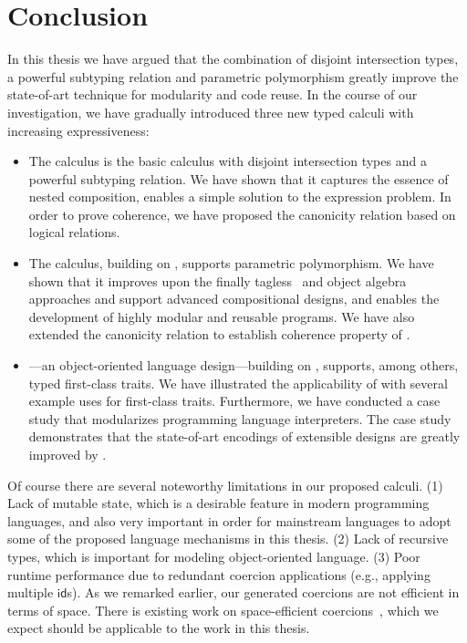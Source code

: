 \chapter{Conclusion}
\label{chap:conclusion}


In this thesis we have argued that the combination of disjoint intersection
types, a powerful subtyping relation and parametric polymorphism greatly improve
the state-of-art technique for modularity and code reuse. In the course of our
investigation, we have gradually introduced three new typed calculi with
increasing expressiveness:
\begin{itemize}
\item The \namee calculus is the basic calculus with disjoint intersection types
  and a powerful subtyping relation. We have shown that it captures the essence
  of nested composition, enables a simple solution to the expression problem. In
  order to prove coherence, we have proposed the canonicity relation based on
  logical relations.
\item The \fnamee calculus, building on \namee, supports parametric
  polymorphism. We have shown that it improves upon the finally
  tagless~\citep{CARETTE_2009} and object
  algebra~\citep{oliveira2012extensibility} approaches and support advanced
  compositional designs, and enables the development of highly modular and
  reusable programs. We have also extended the canonicity relation to establish
  coherence property of \fnamee.
\item \sedel---an object-oriented language design---building on \fnamee,
  supports, among others, typed first-class traits. We have illustrated the
  applicability of \sedel with several example uses for first-class traits.
  Furthermore, we have conducted a case study that modularizes programming
  language interpreters. The case study demonstrates that the state-of-art
  encodings of extensible designs are greatly improved by \sedel.
\end{itemize}


Of course there are several noteworthy limitations in our proposed calculi. (1)
Lack of mutable state, which is a desirable feature in modern programming
languages, and also very important in order for mainstream languages to adopt
some of the proposed language mechanisms in this thesis. (2) Lack of recursive
types, which is important for modeling object-oriented language. (3) Poor
runtime performance due to redundant coercion applications (e.g., applying multiple
$\mathsf{id}$s). As we remarked earlier, our generated coercions are not
efficient in terms of space. There is existing work on space-efficient
coercions~\citep{Siek_2015, herman2010space}, which we expect should be
applicable to the work in this thesis.


